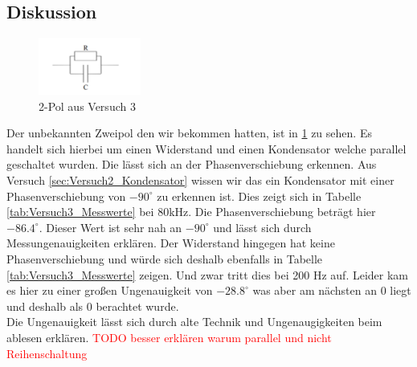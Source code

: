     \subsection{Diskussion}
    \begin{figure}[H]
        \centering
                \includegraphics[width=0.3\textwidth]{bilder/2pol.png}
                \caption{2-Pol aus Versuch 3}
                \label{fig:2pol}
    \end{figure}
    Der unbekannten Zweipol den wir bekommen hatten, ist in \ref{fig:2pol} zu sehen. Es handelt sich hierbei um einen Widerstand und einen Kondensator welche parallel geschaltet wurden. Die lässt sich an der Phasenverschiebung erkennen. Aus Versuch \ref{sec:Versuch2_Kondensator} wissen wir das ein Kondensator mit einer Phasenverschiebung von $-90^{\circ}$ zu erkennen ist. Dies zeigt sich in Tabelle \ref{tab:Versuch3_Messwerte} bei 80kHz. Die Phasenverschiebung beträgt hier $-86.4^{\circ}$. Dieser Wert ist sehr nah an $-90^{\circ}$ und lässt sich durch Messungenauigkeiten erklären. Der Widerstand hingegen hat keine Phasenverschiebung und würde sich deshalb ebenfalls in Tabelle \ref{tab:Versuch3_Messwerte} zeigen. Und zwar tritt dies bei 200 Hz auf. Leider kam es hier zu einer großen Ungenauigkeit von $-28.8^{\circ}$ was aber am nächsten an 0 liegt und deshalb als 0 berachtet wurde.\\

    \noindent Die Ungenauigkeit lässt sich durch alte Technik und Ungenaugigkeiten beim ablesen erklären. 
    \textcolor{red}{TODO besser erklären warum parallel und nicht Reihenschaltung}